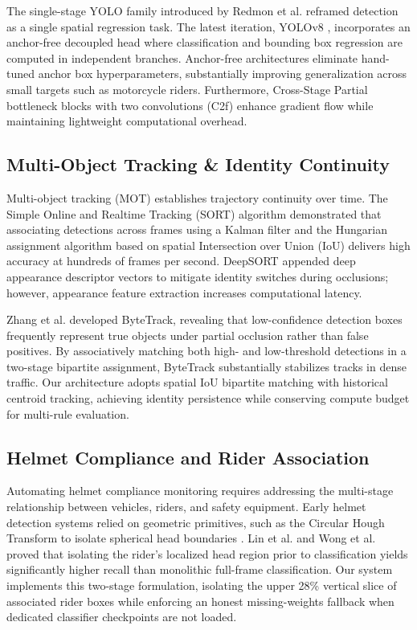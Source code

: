 \documentclass[conference]{IEEEtran}
\begin{document}
The single-stage YOLO family introduced by Redmon et al. \cite{redmon2016you} reframed detection as a single spatial regression task. The latest iteration, YOLOv8 \cite{jocher2023yolov8}, incorporates an anchor-free decoupled head where classification and bounding box regression are computed in independent branches. Anchor-free architectures eliminate hand-tuned anchor box hyperparameters, substantially improving generalization across small targets such as motorcycle riders. Furthermore, Cross-Stage Partial bottleneck blocks with two convolutions (C2f) enhance gradient flow while maintaining lightweight computational overhead.

\subsection{Multi-Object Tracking \& Identity Continuity}
Multi-object tracking (MOT) establishes trajectory continuity over time. The Simple Online and Realtime Tracking (SORT) algorithm \cite{bewley2016simple} demonstrated that associating detections across frames using a Kalman filter and the Hungarian assignment algorithm \cite{kuhn1955hungarian} based on spatial Intersection over Union (IoU) delivers high accuracy at hundreds of frames per second. DeepSORT \cite{wojke2017simple} appended deep appearance descriptor vectors to mitigate identity switches during occlusions; however, appearance feature extraction increases computational latency.

Zhang et al. \cite{zhang2022bytetrack} developed ByteTrack, revealing that low-confidence detection boxes frequently represent true objects under partial occlusion rather than false positives. By associatively matching both high- and low-threshold detections in a two-stage bipartite assignment, ByteTrack substantially stabilizes tracks in dense traffic. Our architecture adopts spatial IoU bipartite matching with historical centroid tracking, achieving identity persistence while conserving compute budget for multi-rule evaluation.

\subsection{Helmet Compliance and Rider Association}
Automating helmet compliance monitoring requires addressing the multi-stage relationship between vehicles, riders, and safety equipment. Early helmet detection systems relied on geometric primitives, such as the Circular Hough Transform to isolate spherical head boundaries \cite{silva2017helmet}. Lin et al. \cite{lin2022automated} and Wong et al. \cite{wong2021two} proved that isolating the rider's localized head region prior to classification yields significantly higher recall than monolithic full-frame classification. Our system implements this two-stage formulation, isolating the upper 28\% vertical slice of associated rider boxes while enforcing an honest missing-weights fallback when dedicated classifier checkpoints are not loaded.
\end{document}
